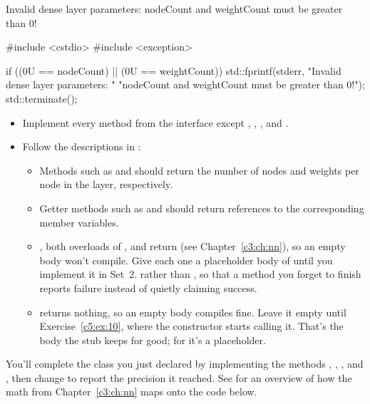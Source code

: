 \begin{console}
Invalid dense layer parameters: nodeCount and weightCount must be greater than 0!
\end{console}

\begin{cppcode}
#include <cstdio>
#include <exception>

if ((0U == nodeCount) || (0U == weightCount))
{
    std::fprintf(stderr, "Invalid dense layer parameters: "
        "nodeCount and weightCount must be greater than 0!\n");
    std::terminate();
}
\end{cppcode}

\begin{itemize}
  \item Implement every method from the interface except ,
    , , and .
  \item Follow the descriptions in :
  \begin{itemize}
    \item Methods such as  and  should return the number of
      nodes and weights per node in the layer, respectively.
    \item Getter methods such as  and  should return references to the
      corresponding member variables.
    \item {}, both overloads of , and 
      return  (see Chapter~\ref{c3:ch:nn}), so an empty body won't compile. Give each
      one a placeholder body of  until you implement it in Set~2.
       rather than , so that a method you forget to finish reports failure
      instead of quietly claiming success.
    \item {} returns nothing, so an empty body compiles fine. Leave it empty until
      Exercise~\ref{c5:ex:10}, where the constructor starts calling it. That's the body the stub
      keeps for good; for  it's a placeholder.
  \end{itemize}
\end{itemize}

\label{c5:set:2}
You'll complete the class  you just declared by implementing the methods
, , , and , then
change  to report the precision it reached. See  for an
overview of how the math from Chapter~\ref{c3:ch:nn} maps onto the code below.

